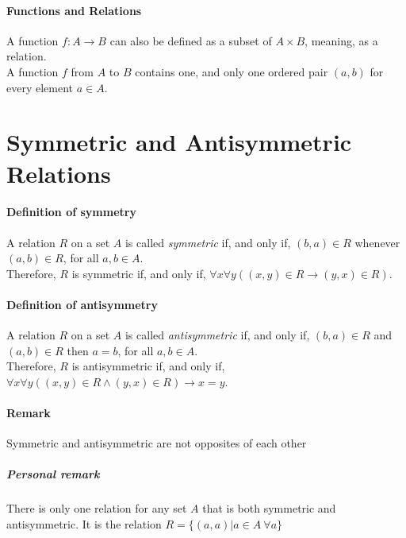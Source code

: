 \documentclass[10pt,a4paper]{book}
\begin{document}
\paragraph*{Functions and Relations}
$\ $\\
\hspace*{\parindent}A function $f:A \to B$ can also be defined as a subset of $A \times B$, meaning, as a relation.\\
\hspace*{\parindent}A function $f$ from $A$ to $B$ contains one, and only one ordered pair $(a,b)$ for every element $a \in A$.

\section{Symmetric and Antisymmetric Relations}

\paragraph*{Definition of symmetry}
$\ $\\
\hspace*{\parindent}A relation $R$ on a set $A$ is called \textit{symmetric} if, and only if, $(b,a) \in R$ whenever $(a,b) \in R$, for all $a,b \in A$.\\
\hspace*{\parindent}Therefore, $R$ is symmetric if, and only if, $\forall x \forall y ((x,y) \in R \to (y,x) \in R)$.

\paragraph*{Definition of antisymmetry}
$\ $\\
\hspace*{\parindent}A relation $R$ on a set $A$ is called \textit{antisymmetric} if, and only if, $(b,a) \in R$ and $(a,b) \in R$ then $a = b$, for all $a,b \in A$.\\
\hspace*{\parindent}Therefore, $R$ is antisymmetric if, and only if, $\forall x \forall y ((x,y) \in R \land (y,x) \in R) \to x = y$.

\paragraph*{Remark}
Symmetric and antisymmetric are not opposites of each other
 
\subparagraph*{Personal remark}
There is only one relation for any set $A$ that is both symmetric and antisymmetric. It is the relation $R = \{(a,a)|a \in A \ \forall a\}$
\end{document}
